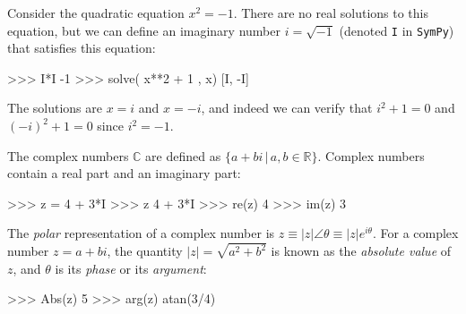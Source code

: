 % 
Consider the quadratic equation $x^2=-1$.
There are no real solutions to this equation,
but we can define an imaginary number $i =\sqrt{-1}$ (denoted \texttt{I} in \texttt{SymPy}) that satisfies this equation:

\small
\begin{verbatimtab}
>>> I*I
-1
>>> solve( x**2 + 1 , x)
[I, -I]
\end{verbatimtab}
\normalsize

\noindent
The solutions are $x=i$ and $x=-i$,
and indeed we can verify that $i^2+1=0$ and $(-i)^2+1=0$
since $i^2=-1$.

The complex numbers $\mathbb{C}$ are defined as $\{ a+bi \,|\, a,b \in \mathbb{R} \}$.
Complex numbers contain a real part and an imaginary part:

\small
\begin{verbatimtab}
>>> z = 4 + 3*I
>>> z 
4 + 3*I
>>> re(z)
4
>>> im(z)
3 
\end{verbatimtab}
\normalsize

\noindent
The \emph{polar} representation of a complex number is $z\!\equiv\!|z|\angle\theta\!\equiv \!|z|e^{i\theta}$.
For a complex number $z=a+bi$, 
the quantity $|z|=\sqrt{a^2+b^2}$ is known as the \emph{absolute value} of $z$,				
and $\theta$ is its \emph{phase} or its \emph{argument}:

\small
\begin{verbatimtab}
>>> Abs(z)
5
>>> arg(z)
atan(3/4)
\end{verbatimtab}
\normalsize

